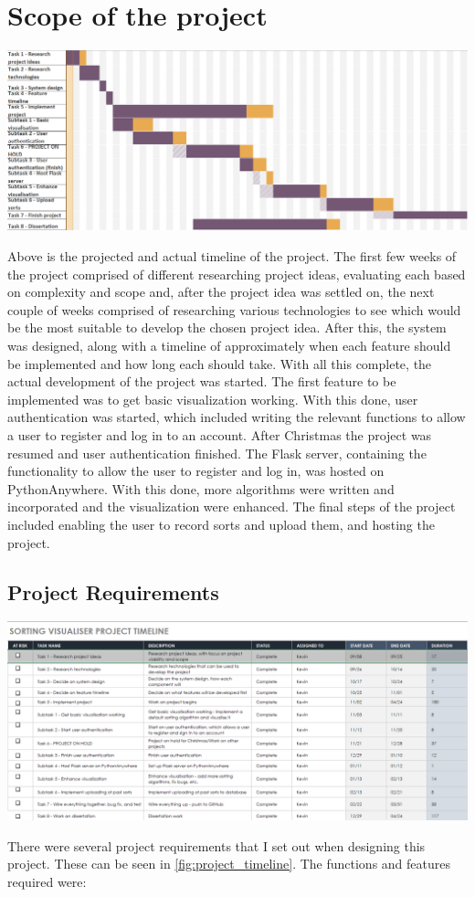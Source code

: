 \section{Scope of the project}
\begin{center}
    \includegraphics[scale=.3]{images/project_timeline} 
    \label{fig:project_timeline}
\end{center}
Above is the projected and actual timeline of the project. The first few weeks of the project comprised of different researching project ideas, evaluating each based on complexity and scope and, after the project idea was settled on, the next couple of weeks comprised of researching various technologies to see which would be the most suitable to develop the chosen project idea. After this, the system was designed, along with a timeline of approximately when each feature should be implemented and how long each should take. With all this complete, the actual development of the project was started. The first feature to be implemented was to get basic visualization working. With this done, user authentication was started, which included writing the relevant functions to allow a user to register and log in to an account. After Christmas the project was resumed and user authentication finished. The Flask server, containing the functionality to allow the user to register and log in, was hosted on PythonAnywhere. With this done, more algorithms were written and incorporated and the visualization were enhanced. The final steps of the project included enabling the user to record sorts and upload them, and hosting the project. 

\subsection{Project Requirements}
\begin{center}
    \includegraphics[width=16cm]{images/project_plan} 
    \label{fig:project_plan}
\end{center}
There were several project requirements that I set out when designing this
project. These can be seen in \ref{fig:project_timeline}. The functions and
features required were:

